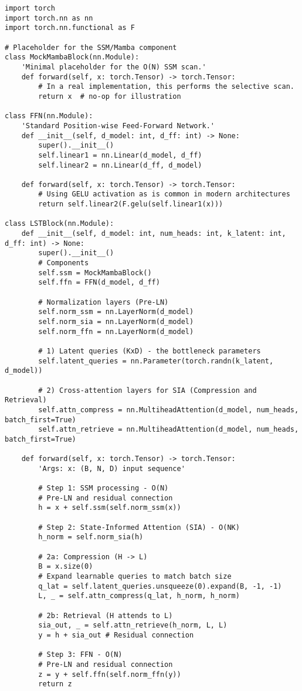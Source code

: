 \documentclass[10pt,twocolumn,letterpaper]{article}
\begin{document}
\begin{lstlisting}[style=pytorchstyle, caption={PyTorch-style pseudocode for the LST Block.}, label=lst:code_block]
import torch
import torch.nn as nn
import torch.nn.functional as F

# Placeholder for the SSM/Mamba component
class MockMambaBlock(nn.Module):
    'Minimal placeholder for the O(N) SSM scan.'
    def forward(self, x: torch.Tensor) -> torch.Tensor:
        # In a real implementation, this performs the selective scan.
        return x  # no-op for illustration

class FFN(nn.Module):
    'Standard Position-wise Feed-Forward Network.'
    def __init__(self, d_model: int, d_ff: int) -> None:
        super().__init__()
        self.linear1 = nn.Linear(d_model, d_ff)
        self.linear2 = nn.Linear(d_ff, d_model)

    def forward(self, x: torch.Tensor) -> torch.Tensor:
        # Using GELU activation as is common in modern architectures
        return self.linear2(F.gelu(self.linear1(x)))

class LSTBlock(nn.Module):
    def __init__(self, d_model: int, num_heads: int, k_latent: int, d_ff: int) -> None:
        super().__init__()
        # Components
        self.ssm = MockMambaBlock()
        self.ffn = FFN(d_model, d_ff)

        # Normalization layers (Pre-LN)
        self.norm_ssm = nn.LayerNorm(d_model)
        self.norm_sia = nn.LayerNorm(d_model)
        self.norm_ffn = nn.LayerNorm(d_model)

        # 1) Latent queries (KxD) - the bottleneck parameters
        self.latent_queries = nn.Parameter(torch.randn(k_latent, d_model))

        # 2) Cross-attention layers for SIA (Compression and Retrieval)
        self.attn_compress = nn.MultiheadAttention(d_model, num_heads, batch_first=True)
        self.attn_retrieve = nn.MultiheadAttention(d_model, num_heads, batch_first=True)

    def forward(self, x: torch.Tensor) -> torch.Tensor:
        'Args: x: (B, N, D) input sequence'

        # Step 1: SSM processing - O(N)
        # Pre-LN and residual connection
        h = x + self.ssm(self.norm_ssm(x))

        # Step 2: State-Informed Attention (SIA) - O(NK)
        h_norm = self.norm_sia(h)

        # 2a: Compression (H -> L)
        B = x.size(0)
        # Expand learnable queries to match batch size
        q_lat = self.latent_queries.unsqueeze(0).expand(B, -1, -1)
        L, _ = self.attn_compress(q_lat, h_norm, h_norm)

        # 2b: Retrieval (H attends to L)
        sia_out, _ = self.attn_retrieve(h_norm, L, L)
        y = h + sia_out # Residual connection

        # Step 3: FFN - O(N)
        # Pre-LN and residual connection
        z = y + self.ffn(self.norm_ffn(y))
        return z
\end{lstlisting}
\end{document}
